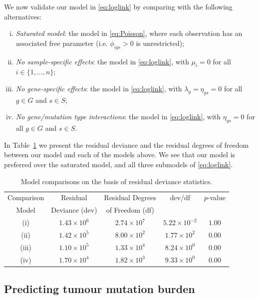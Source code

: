\documentclass[12pt]{article}
\begin{document}
We now validate our model in \eqref{eq:loglink} by comparing with the following alternatives: 
\begin{enumerate}[(i)]
\item \emph{Saturated model}: the model in \eqref{eq:Poisson}, where each observation has an associated free parameter (i.e. $\phi_{igs} > 0$ is unrestricted);
\item \emph{No sample-specific effects}: the model in \eqref{eq:loglink}, with $\mu_i = 0$ for all $i \in \{1,\ldots, n\}$;
\item \emph{No gene-specific effects}: the model in \eqref{eq:loglink}, with $\lambda_g = \eta_{gs} = 0$ for all $g \in G$ and $s\in S$; 
\item \emph{No gene/mutation type interactions}: the model in \eqref{eq:loglink}, with $\eta_{gs} =0$ for all $g \in G$ and $s\in S$.
\end{enumerate}

In Table~\ref{table:goodnessoffit} we present the residual deviance and the residual degrees of freedom between our model and each of the models above. We see that our model is preferred over the saturated model, and all three submodels of \eqref{eq:loglink}. 

\begin{table}[ht]
\begin{center}
\caption{Model comparisons on the basis of residual deviance statistics. \label{table:goodnessoffit}}
\begin{tabular}{ | c | c | c | c  | c |}
\hline
Comparison  & Residual  & Residual Degrees & dev/df & $p$-value \\
Model            & Deviance (dev)             & of Freedom (df)  &        &           \\
\hline
(i) & $1.43 \times 10^6$  & $2.74 \times 10^7$  &  $5.22 \times 10^{-2}$  &  $1.00$ \\
\hline
(ii)  & $1.42 \times 10^5$  &  $8.00 \times 10^2$  & $1.77 \times 10^2$ & $0.00$\\
(iii)  &  $1.10 \times 10^5 $ & $1.33 \times 10^4$  & $8.24 \times 10^0$ &  $0.00$\\
(iv) & $1.70 \times 10^4$ & $1.82 \times 10^3$ & $9.33 \times 10^0$ & $0.00$ \\
\hline
\end{tabular}
\vspace*{-10mm}
\end{center}
\end{table}


\subsection{Predicting tumour mutation burden \label{sec:tmb}}
\end{document}
